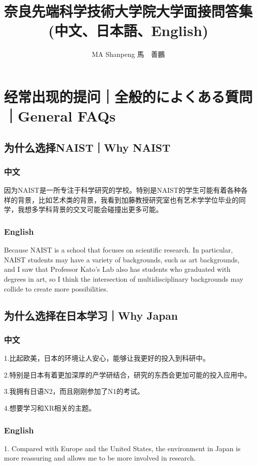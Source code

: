 \documentclass[lang=cn,11pt,a4paper]{elegantpaper}
\title{奈良先端科学技術大学院大学面接問答集\\(中文、日本語、English)}
\author{MA Shanpeng 馬　善鵬}
\institute{\href{https://inusturbo.github.io/}{個人ホームページ}}
\date{\zhtoday}
\begin{document}
\maketitle

\begin{abstract}


\end{abstract}

 \tableofcontents
 \newpage
\section{经常出现的提问｜全般的によくある質問｜General FAQs}
\subsection{为什么选择NAIST｜Why NAIST}
\subsubsection{中文}
因为NAIST是一所专注于科学研究的学校。特别是NAIST的学生可能有着各种各样的背景，比如艺术类的背景，我看到加藤教授研究室也有艺术学学位毕业的同学，我想多学科背景的交叉可能会碰撞出更多可能。
\subsubsection{English}
Because NAIST is a school that focuses on scientific research. In particular, NAIST students may have a variety of backgrounds, such as art backgrounds, and I saw that Professor Kato's Lab also has students who graduated with degrees in art, so I think the intersection of multidisciplinary backgrounds may collide to create more possibilities.
\subsection{为什么选择在日本学习｜Why Japan}
\subsubsection{中文}
1.比起欧美，日本的环境让人安心，能够让我更好的投入到科研中。

2.特别是日本有着更加深厚的产学研结合，研究的东西会更加可能的投入应用中。

3.我拥有日语N2，而且刚刚参加了N1的考试。

4.想要学习和XR相关的主题。
\subsubsection{English}
1. Compared with Europe and the United States, the environment in Japan is more reassuring and allows me to be more involved in research.
\end{document}
